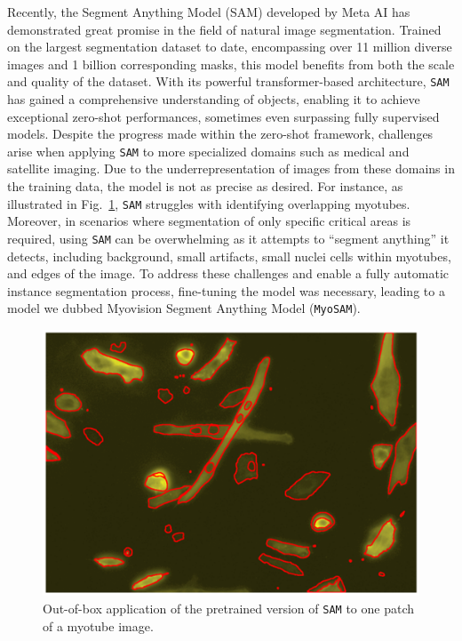 Recently, the Segment Anything Model (SAM) \cite{kirillov2023segment} developed by Meta AI has demonstrated great promise in the field of natural image segmentation. Trained on the largest segmentation dataset to date, encompassing over 11 million diverse images and 1 billion corresponding masks, this model benefits from both the scale and quality of the dataset. With its powerful transformer-based architecture, \texttt{SAM} has gained a comprehensive understanding of objects, enabling it to achieve exceptional zero-shot performances, sometimes even surpassing fully supervised models.
Despite the progress made within the zero-shot framework, challenges arise when applying \texttt{SAM} to more specialized domains such as medical and satellite imaging. Due to the underrepresentation of images from these domains in the training data, the model is not as precise as desired. For instance, as illustrated in Fig.~\ref{figzeroshot}, \texttt{SAM} struggles with identifying overlapping myotubes. Moreover, in scenarios where segmentation of only specific critical areas is required, using \texttt{SAM} can be overwhelming as it attempts to “segment anything” it detects, including background, small artifacts, small nuclei cells within myotubes, and edges of the image. To address these challenges and enable a fully automatic instance segmentation process, fine-tuning the model was necessary, leading to a model we dubbed Myovision Segment Anything Model (\texttt{MyoSAM}).

\begin{figure}
	\centering
	\includegraphics[width=\textwidth]{"images/sam_zeroshot.png"}
	\caption[\texttt{SAM} zero-shot]{Out-of-box application of the pretrained version of \texttt{SAM} to one patch of a myotube image.}
	\label{figzeroshot}
\end{figure}
